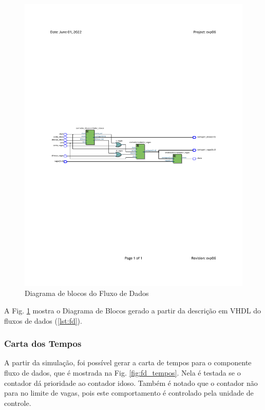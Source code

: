 \documentclass[a4,12pt]{horizon-theme}
\begin{document}
\begin{figure}[!ht]
    \centering
    \includegraphics[width=\textwidth, trim={25mm, 120mm, 25mm, 120mm}, clip]{fd_blocos}
    \caption{Diagrama de blocos do Fluxo de Dados}
    \label{fig:fd_blocos}
\end{figure}

A Fig. \ref{fig:fd_blocos} mostra o Diagrama de Blocos gerado a partir da descrição em VHDL do fluxos de dados (\ref{lst:fd}).


\subsubsection{Carta dos Tempos}
\label{sec:fd_tempos}

A partir da simulação, foi possível gerar a carta de tempos para o componente fluxo de dados, que é mostrada na Fig. \ref{fig:fd_tempos}. Nela é testada se o contador dá prioridade ao contador idoso. Também é notado que o contador não para no limite de vagas, pois este comportamento é controlado pela unidade de controle.
\end{document}
